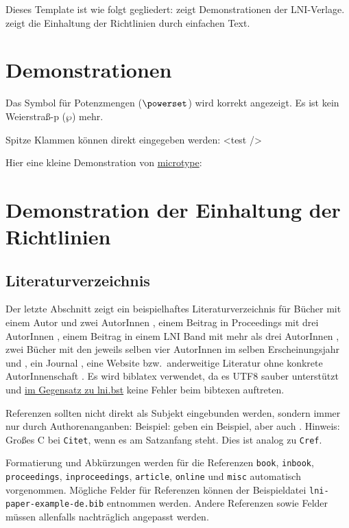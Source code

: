 \documentclass[utf8,biblatex]{lni}
\begin{document}
    Dieses Template ist wie folgt gegliedert:
     zeigt Demonstrationen der LNI-Verlage.
     zeigt die Einhaltung der Richtlinien durch einfachen Text.

    \section{Demonstrationen}
    \label{sec:demos}
    Das Symbol für Potenzmengen ($\powerset$) wird korrekt angezeigt.
    Es ist kein Weierstraß-p ($\wp$) mehr.

    Spitze Klammen können direkt eingegeben werden: <test />

    Hier eine kleine Demonstration von \href{https://www.ctan.org/pkg/microtype}{microtype}:
    \blindtext

    \section{Demonstration der Einhaltung der Richtlinien}
    \label{sec:lniconformance}

    \subsection{Literaturverzeichnis}
    Der letzte Abschnitt zeigt ein beispielhaftes Literaturverzeichnis für Bücher mit einem Autor \cite{Ez10} und zwei AutorInnen \cite{AB00}, einem Beitrag in Proceedings mit drei AutorInnen \cite{ABC01}, einem Beitrag in einem LNI Band mit mehr als drei AutorInnen \cite{Az09}, zwei Bücher mit den jeweils selben vier AutorInnen im selben Erscheinungsjahr \cite{Wa14} und \cite{Wa14b}, ein Journal \cite{Gl06}, eine Website \cite{GI19} bzw.\ anderweitige Literatur ohne konkrete AutorInnenschaft \cite{XX14}.
    Es wird biblatex verwendet, da es UTF8 sauber unterstützt und \href{https://github.com/gi-ev/LNI/issues/5}{im Gegensatz zu lni.bst} keine Fehler beim bibtexen auftreten.

    Referenzen sollten nicht direkt als Subjekt eingebunden werden, sondern immer nur durch Authorenanganben:
    Beispiel:  geben ein Beispiel, aber auch \citet{Az09}.
    Hinweis: Großes C bei \texttt{Citet}, wenn es am Satzanfang steht. Dies ist analog zu \texttt{Cref}.

    Formatierung und Abkürzungen werden für die Referenzen \texttt{book}, \texttt{inbook}, \texttt{proceedings}, \texttt{inproceedings}, \texttt{article}, \texttt{online} und \texttt{misc} automatisch vorgenommen.
    Mögliche Felder für Referenzen können der Beispieldatei \texttt{lni-paper-example-de.bib} entnommen werden.
    Andere Referenzen sowie Felder müssen allenfalls nachträglich angepasst werden.
\end{document}
